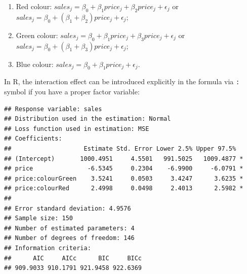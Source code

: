 \documentclass[
]{book}
\newenvironment{Shaded}{\begin{snugshade}}{\end{snugshade}}
\newcommand{\CommentTok}[1]{\textcolor[rgb]{0.56,0.35,0.01}{\textit{#1}}}
\newcommand{\DataTypeTok}[1]{\textcolor[rgb]{0.13,0.29,0.53}{#1}}
\newcommand{\DecValTok}[1]{\textcolor[rgb]{0.00,0.00,0.81}{#1}}
\newcommand{\KeywordTok}[1]{\textcolor[rgb]{0.13,0.29,0.53}{\textbf{#1}}}
\newcommand{\NormalTok}[1]{#1}
\newcommand{\OperatorTok}[1]{\textcolor[rgb]{0.81,0.36,0.00}{\textbf{#1}}}
\newcommand{\StringTok}[1]{\textcolor[rgb]{0.31,0.60,0.02}{#1}}
\providecommand{\tightlist}{%
  \setlength{\itemsep}{0pt}\setlength{\parskip}{0pt}}
\theoremstyle{definition}
\theoremstyle{definition}
\theoremstyle{definition}
\theoremstyle{definition}
\theoremstyle{remark}
\begin{document}
\begin{enumerate}
\def\labelenumi{\arabic{enumi}.}
\tightlist
\item
  Red colour: \(sales_j = \beta_0 + \beta_1 price_j + \beta_2 price_j + \epsilon_j\) or \(sales_j = \beta_0 + (\beta_1 + \beta_2) price_j + \epsilon_j\);
\item
  Green colour: \(sales_j = \beta_0 + \beta_1 price_j + \beta_3 price_j + \epsilon_j\) or \(sales_j = \beta_0 + (\beta_1 + \beta_3) price_j + \epsilon_j\);
\item
  Blue colour: \(sales_j = \beta_0 + \beta_1 price_j + \epsilon_j\).
\end{enumerate}

In R, the interaction effect can be introduced explicitly in the formula via \texttt{:} symbol if you have a proper factor variable:

\begin{Shaded}
\end{Shaded}

\begin{verbatim}
## Response variable: sales
## Distribution used in the estimation: Normal
## Loss function used in estimation: MSE
## Coefficients:
##                    Estimate Std. Error Lower 2.5% Upper 97.5%  
## (Intercept)       1000.4951     4.5501   991.5025   1009.4877 *
## price               -6.5345     0.2304    -6.9900     -6.0791 *
## price:colourGreen    3.5241     0.0503     3.4247      3.6235 *
## price:colourRed      2.4998     0.0498     2.4013      2.5982 *
## 
## Error standard deviation: 4.9576
## Sample size: 150
## Number of estimated parameters: 4
## Number of degrees of freedom: 146
## Information criteria:
##      AIC     AICc      BIC     BICc 
## 909.9033 910.1791 921.9458 922.6369
\end{verbatim}
\end{document}
